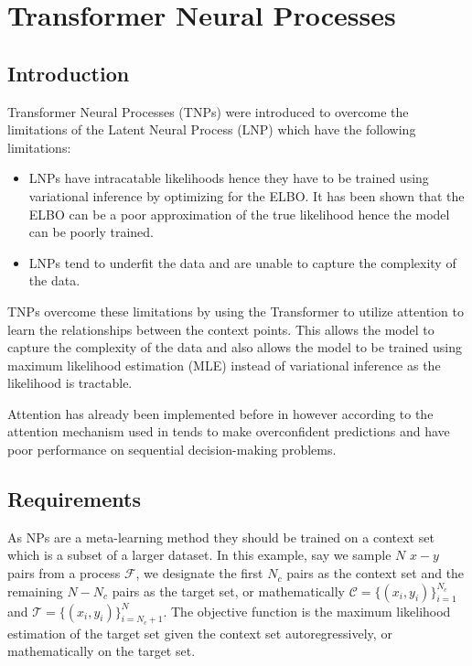 \documentclass[main.tex]{subfiles}
\begin{document}
\section{Transformer Neural Processes}

\subsection{Introduction}

Transformer Neural Processes (TNPs) \cite{nguyen2023transformer} were introduced to overcome the limitations of the Latent Neural Process (LNP) \cite{garnelo2018neural} which have the following limitations:

\begin{itemize}
	\item LNPs have intracatable likelihoods hence they have to be trained using variational inference by optimizing for the ELBO. It has been shown that the ELBO can be a poor approximation of the true likelihood hence the model can be poorly trained.
	\item LNPs tend to underfit the data and are unable to capture the complexity of the data.
\end{itemize}

TNPs overcome these limitations by using the Transformer \cite{vaswani2017attention} to utilize attention to learn the relationships between the context points. This allows the model to capture the complexity of the data and also allows the model to be trained using maximum likelihood estimation (MLE) instead of variational inference as the likelihood is tractable.

Attention has already been implemented before \cite{nguyen2023transformer} in \cite{kim2019attentive} however according to \cite{nguyen2023transformer} the attention mechanism used in \cite{kim2019attentive} tends to make overconfident predictions and have poor performance on sequential decision-making problems.

\subsection{Requirements}

As NPs are a meta-learning method they should be trained on a context set which is a subset of a larger dataset. In this example, say we sample $N$ $x-y$ pairs from a process $\mathcal{F}$, we designate the first $N_c$ pairs as the context set and the remaining $N-N_c$ pairs as the target set, or mathematically $\mathcal{C} = \{(x_i, y_i)\}_{i=1}^{N_c}$ and $\mathcal{T} = \{(x_i, y_i)\}_{i=N_c+1}^{N}$. The objective function is the maximum likelihood estimation of the target set given the context set autoregressively, or mathematically on the target set.
\end{document}
